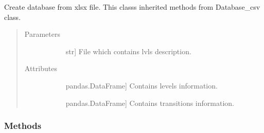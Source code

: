 \documentclass[letterpaper,10pt,english]{sphinxmanual}
\begin{document}
\begin{fulllineitems}
\begin{fulllineitems}
\begin{quote}
\begin{description}
\end{description}\end{quote}

\end{fulllineitems}


\end{fulllineitems}


\begin{fulllineitems}
\label{\detokenize{nice_scheme_plotter:database_reader.Database_xlsx}}
Create database from xlsx file. This classs inherited methods from Database\_csv class.
\begin{quote}\begin{description}
\item[{Parameters}] \leavevmode\begin{description}
\item[{}] \leavevmode{[}str{]}
File which contains lvls description.

\end{description}

\item[{Attributes}] \leavevmode\begin{description}
\item[{}] \leavevmode{[}pandas.DataFrame{]}
Contains levels information.

\item[{}] \leavevmode{[}pandas.DataFrame{]}
Contains transitions information.

\end{description}

\end{description}\end{quote}
\subsubsection*{Methods}


\begin{savenotes}\sphinxatlongtablestart\begin{longtable}{}
\hline

\endfirsthead


\end{longtable}
\end{savenotes}
\end{fulllineitems}
\end{document}
